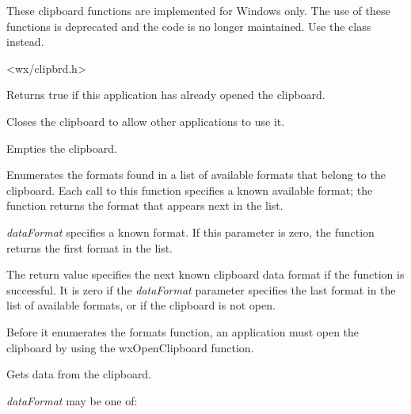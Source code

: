 These clipboard functions are implemented for Windows only. The use of these functions
is deprecated and the code is no longer maintained. Use the 
class instead.


<wx/clipbrd.h>


\label{functionwxclipboardopen}


Returns true if this application has already opened the clipboard.


\label{wxcloseclipboard}


Closes the clipboard to allow other applications to use it.


\label{wxemptyclipboard}


Empties the clipboard.


\label{wxenumclipboardformats}


Enumerates the formats found in a list of available formats that belong
to the clipboard. Each call to this  function specifies a known
available format; the function returns the format that appears next in
the list.

{\it dataFormat} specifies a known format. If this parameter is zero,
the function returns the first format in the list.

The return value specifies the next known clipboard data format if the
function is successful. It is zero if the {\it dataFormat} parameter specifies
the last  format in the list of available formats, or if the clipboard
is not open.

Before it enumerates the formats function, an application must open the clipboard by using the
wxOpenClipboard function.


\label{wxgetclipboarddata}


Gets data from the clipboard.

{\it dataFormat} may be one of:

